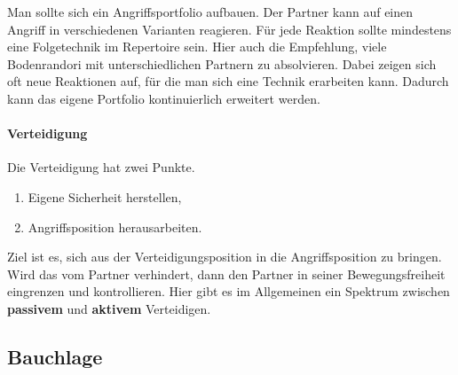 \documentclass[justified, a4paper, notitlepage, captions=tableheading, nobib]{tufte-handout}
\begin{document}
Man sollte sich ein Angriffsportfolio aufbauen. Der Partner kann auf einen Angriff in verschiedenen Varianten reagieren. 
Für jede Reaktion sollte mindestens eine Folgetechnik im Repertoire sein. 
Hier auch die Empfehlung, viele Bodenrandori mit unterschiedlichen Partnern zu absolvieren. 
Dabei zeigen sich oft neue Reaktionen auf, für die man sich eine Technik erarbeiten kann. 
Dadurch kann das eigene Portfolio kontinuierlich erweitert werden. 

\paragraph{Verteidigung}
\label{sec:org78c586c}
Die Verteidigung hat zwei Punkte. 
\begin{enumerate}
\item Eigene Sicherheit herstellen,
\item Angriffsposition herausarbeiten.
\end{enumerate}
Ziel ist es, sich aus der Verteidigungsposition in die Angriffsposition zu bringen. 
Wird das vom Partner verhindert, dann den Partner in seiner Bewegungsfreiheit eingrenzen und kontrollieren.
Hier gibt es im Allgemeinen ein Spektrum zwischen \textbf{passivem} und \textbf{aktivem} Verteidigen. 

\subsection{\label{org8d6889b}Bauchlage }
\label{sec:org4fd1f8a}
\end{document}
